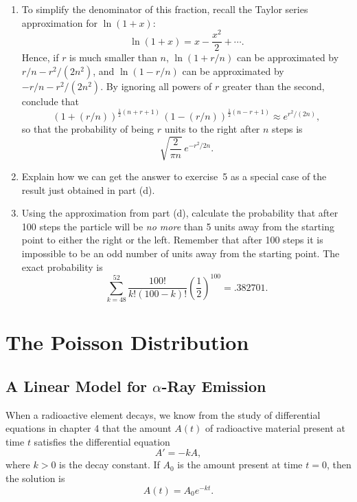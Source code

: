\begin{enumerate}
\begin{enumerate}
  \item To simplify the denominator of this fraction, recall the Taylor
series approximation for $\ln(1+x)$:
\[
\ln(1+x)=x-\dfrac{x^2}{2} +\cdots .
\]
Hence, if $r$ is much smaller than $n$, $\ln(1+r/n)$ can be
approximated by $r/n-r^2/(2n^2)$, and $\ln(1-r/n)$ can be approximated
by $-r/n-r^2/(2n^2)$. By ignoring all powers of $r$ greater than the
second, conclude that
\[
(1+(r/n))^{\frac{1}{2}(n+r+1)}\,(1-(r/n))^{\frac{1}{2}(n-r+1)}
    \approx e^{r^2/(2n)},
\]
so that the probability of being $r$ units to the right after $n$ steps is
\[
\sqrt{\dfrac{2}{\pi n}} \, e^{-r^2/2n}.
\]


  \item Explain how we can get the answer to exercise~5 as a special case
of the result just obtained in part (d).

  \item Using the approximation from part (d), calculate the probability
that after 100 steps the particle will be {\em no more} than 5 units
away from the starting point to either the right or the left.
Remember that after 100 steps it is impossible to be an odd number of
units away from the starting point.  The exact probability is
\[
\sum_{k=48}^{52} \dfrac{100!}{k!(100-k)!}
  \left(\dfrac{1}{2}\right)^{100} = .382701.
\]





\end{enumerate}
\end{enumerate}
\section{The Poisson Distribution}
\label{sec:the-poisson-distribution}

\subsection{A Linear Model for $\alpha$-Ray Emission}
\label{subsec:a-linear-model-for-alpha-ray-emission}

When a radioactive element decays, we know from the study of
differential equations in chapter 4 that the amount $A(t)$ of
radioactive material present at time $t$ satisfies the differential
equation
\[
A' = -kA,
\]
where $k > 0$ is the decay constant.  If $A_0$ is the amount present
at time $t = 0$, then the solution is
\[
A(t) = A_0e^{-kt}.
\]

